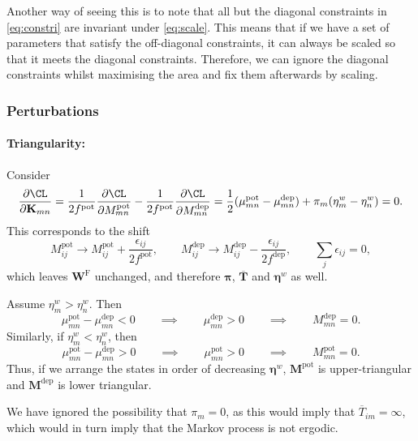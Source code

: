 \documentclass[12pt]{article}
\newcommand{\eqm}{\pi}
\newcommand{\eq}{\boldsymbol{\eqm}}
\newcommand{\fptm}{T}
\newcommand{\fpt}{\mathbf{\fptm}}
\newcommand{\fptbm}{\overline{\fptm}}
\newcommand{\fptb}{\overline{\fpt}}
\newcommand{\etwm}{\eta^w}
\newcommand{\etw}{\boldsymbol{\eta}^w}
\newcommand{\Wm}{W}
\newcommand{\W}{\mathbf{\Wm}}
\newcommand{\MMdm}{M}
\newcommand{\MMd}{\mathbf{\MMdm}}
\newcommand{\encm}{K}
\newcommand{\enc}{\mathbf{\encm}}
\newcommand{\frg}{\W^{\mathrm{F}}}
\newcommand{\pot}{^{\text{pot}}}
\newcommand{\dep}{^{\text{dep}}}
\renewcommand{\pdiff}[2]{\frac{\partial #1}{\partial #2}}
\begin{document}
Another way of seeing this is to note that all but the diagonal constraints in \cref{eq:constri} are invariant under \cref{eq:scale}.
This means that if we have a set of parameters that satisfy the off-diagonal constraints, it can always be scaled so that it meets the diagonal constraints.
Therefore, we can ignore the diagonal constraints whilst maximising the area and fix them afterwards by  scaling.


\subsubsection{Perturbations}\label{sec:areapert}

\paragraph{Triangularity:}\label{sec:triangular}

Consider
%
\begin{equation}\label{eq:shiftqderiv}
  \pdiff{\CL}{\enc_{mn}} =
  \frac{1}{2f\pot} \pdiff{\CL}{\MMdm\pot_{mn}} - \frac{1}{2f\pot} \pdiff{\CL}{\MMdm\dep_{mn}}
   = \frac{1}{2}(\mu\pot_{mn} - \mu\dep_{mn}) + \eqm_m (\etwm_m - \etwm_n)
   = 0.
\end{equation}
%
This corresponds to the shift
%
\begin{equation}\label{eq:shiftq}
  \MMdm\pot_{ij} \to \MMdm\pot_{ij} + \frac{\epsilon_{ij}}{2f\pot},
  \qquad
  \MMdm\dep_{ij} \to \MMdm\dep_{ij} - \frac{\epsilon_{ij}}{2f\dep},
  \qquad
  \sum_j \epsilon_{ij} = 0,
\end{equation}
%
which leaves $\frg$ unchanged, and therefore $\eq$, $\fptb$ and $\etw$ as well.

Assume $\etwm_m > \etwm_n$. Then
%
\begin{equation}\label{eq:lowertriangular}
 \mu\pot_{mn} - \mu\dep_{mn} < 0
 \qquad\implies\qquad
 \mu\dep_{mn} > 0
 \qquad\implies\qquad
 \MMdm\dep_{mn} = 0.
\end{equation}
%
Similarly, if $\etwm_m < \etwm_n$, then
%
\begin{equation}\label{eq:uppertriangular}
 \mu\pot_{mn} - \mu\dep_{mn} > 0
 \qquad\implies\qquad
 \mu\pot_{mn} >0
 \qquad\implies\qquad
 \MMdm\pot_{mn}=0.
\end{equation}
%
Thus, if we arrange the states in order of decreasing $\etw$, $\MMd\pot$ is upper-triangular and $\MMd\dep$ is lower triangular.

We have ignored the possibility that $\eqm_m = 0$, as this would imply that $\fptbm_{im} = \infty$, which would in turn imply that the Markov process is not ergodic.
\end{document}
